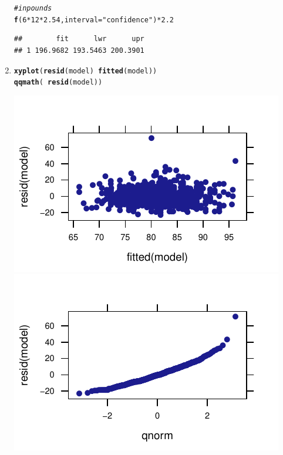 \documentclass[twoside]{book}\usepackage[]{graphicx}\usepackage[]{xcolor}
\makeatletter
\def\maxwidth{ %
  \ifdim\Gin@nat@width>\linewidth
    \linewidth
  \else
    \Gin@nat@width
  \fi
}
\newcommand{\hlnum}[1]{\textcolor[rgb]{0.686,0.059,0.569}{#1}}%
\newcommand{\hlstr}[1]{\textcolor[rgb]{0.192,0.494,0.8}{#1}}%
\newcommand{\hlcom}[1]{\textcolor[rgb]{0.678,0.584,0.686}{\textit{#1}}}%
\newcommand{\hlopt}[1]{\textcolor[rgb]{0,0,0}{#1}}%
\newcommand{\hlstd}[1]{\textcolor[rgb]{0.345,0.345,0.345}{#1}}%
\newcommand{\hlkwc}[1]{\textcolor[rgb]{0.333,0.667,0.333}{#1}}%
\newcommand{\hlkwd}[1]{\textcolor[rgb]{0.737,0.353,0.396}{\textbf{#1}}}%
\newenvironment{kframe}{%
 \def\at@end@of@kframe{}%
 \ifinner\ifhmode%
  \def\at@end@of@kframe{\end{minipage}}%
  \begin{minipage}{\columnwidth}%
 \fi\fi%
 \def\FrameCommand##1{\hskip\@totalleftmargin \hskip-\fboxsep
 \colorbox{shadecolor}{##1}\hskip-\fboxsep
     \hskip-\linewidth \hskip-\@totalleftmargin \hskip\columnwidth}%
 \MakeFramed {\advance\hsize-\width
   \@totalleftmargin\z@ \linewidth\hsize
   \@setminipage}}%
 {\par\unskip\endMakeFramed%
 \at@end@of@kframe}
\newenvironment{knitrout}{}{} %
\makeatother
\begin{document}
\begin{solution}
\begin{enumerate}
\begin{knitrout}
\begin{kframe}
\begin{verbatim}
\end{verbatim}
\begin{alltt}
\hlcom{# in pounds}
\hlkwd{f}\hlstd{(}\hlnum{6} \hlopt{*} \hlnum{12} \hlopt{*} \hlnum{2.54}\hlstd{,} \hlkwc{interval} \hlstd{=} \hlstr{"confidence"}\hlstd{)} \hlopt{*} \hlnum{2.2}
\end{alltt}
\begin{verbatim}
##        fit      lwr      upr
## 1 196.9682 193.5463 200.3901
\end{verbatim}
\end{kframe}
\end{knitrout}
		\item
\begin{knitrout}
\color{fgcolor}\begin{kframe}
\begin{alltt}
\hlkwd{xyplot}\hlstd{(}\hlkwd{resid}\hlstd{(model)} \hlopt{~} \hlkwd{fitted}\hlstd{(model))}
\hlkwd{qqmath}\hlstd{(}\hlopt{~}\hlkwd{resid}\hlstd{(model))}
\end{alltt}
\end{kframe}

{\centering \includegraphics[width=\maxwidth]{figures/fig-unnamed-chunk-194-1} 
\includegraphics[width=\maxwidth]{figures/fig-unnamed-chunk-194-2} 

}
\end{knitrout}
\end{enumerate}
\end{solution}
\end{document}
